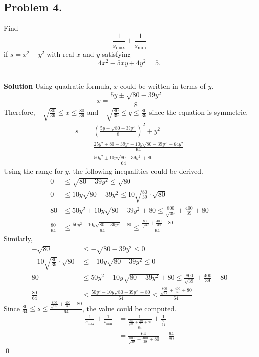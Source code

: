 \documentclass{article}
\newenvironment{solution}{\begin{trivlist}\item[]{\bf Solution}}{\qed \end{trivlist}}
\newcommand{\MyLine}{\noindent\rule{0.99\textwidth}{0.4pt}}
\begin{document}
\subsection*{Problem 4.}
{\color {Gray}
Find
\[
\frac{1}{s_{\max}} + \frac{1}{s_{\min}}
\]
if $s = x^2 + y^2$
with real $x$ and $y$ satisfying
\[
4x^2 - 5xy + 4y^2 = 5.
\]
}
\MyLine
\begin{solution}
Using quadratic formula, $x$ could be written in terms of $y$.
\[
x = \frac{5y \pm \sqrt{80 - 39y^2}}{8}
\]
Therefore, $-\sqrt{\frac{80}{39}} \leq x \leq \frac{80}{39}$
and $-\sqrt{\frac{80}{39}} \leq y \leq \frac{80}{39}$ since
the equation is symmetric.
\begin{align*}
    s
    &= \left( \frac{5y \pm \sqrt{80 - 39y^2}}{8} \right)^2 + y^2 \\
    &= \frac{25y^2 + 80 - 39y^2 \pm 10y\sqrt{80 - 39y^2} + 64y^2}{64} \\
    &= \frac{50y^2 \pm 10y\sqrt{80 - 39y^2} + 80}{64}
\end{align*}
Using the range for $y$, the following inequalities could be derived.
\begin{align*}
    0 &\leq \sqrt{80 - 39y^2} \leq \sqrt{80} \\
    0 &\leq 10y\sqrt{80 - 39y^2}
        \leq 10 \sqrt{\frac{80}{39}} \cdot \sqrt{80} \\
    80 &\leq 50y^2 + 10y\sqrt{80 - 39y^2} + 80
        \leq \frac{800}{\sqrt{39}} + \frac{400}{39} + 80 \\
    \frac{80}{64} &\leq \frac{50y^2 + 10y\sqrt{80 - 39y^2} + 80}{64}
        \leq \frac{\frac{800}{\sqrt{39}} + \frac{400}{39} + 80}{64}
\end{align*}
Similarly,
\begin{align*}
    -\sqrt{80} &\leq -\sqrt{80 - 39y^2} \leq 0 \\
    -10 \sqrt{\frac{80}{39}} \cdot
        \sqrt{80} &\leq -10y\sqrt{80 - 39y^2} \leq 0 \\
    80 &\leq 50y^2 - 10y\sqrt{80 - 39y^2} + 80
        \leq \frac{800}{\sqrt{39}} + \frac{400}{39} + 80 \\
    \frac{80}{64} &\leq \frac{50y^2 - 10y\sqrt{80 - 39y^2} + 80}{64}
        \leq \frac{\frac{800}{\sqrt{39}} + \frac{400}{39} + 80}{64}
\end{align*}
Since $\frac{80}{64} \leq s \leq \frac{\frac{800}{\sqrt{39}}
+ \frac{400}{39} + 80}{64}$, the value could be computed.
\begin{align*}
    \frac{1}{s_{\max}} + \frac{1}{s_{\min}}
    &= \frac{1}{\frac{\frac{800}{\sqrt{39}} + \frac{400}{39} + 80}{64}} + \frac{1}{\frac{80}{64}} \\
    &= \boxed{\frac{64}{\frac{800}{\sqrt{39}} + \frac{400}{39} + 80} + \frac{64}{80}}
\end{align*}
\end{solution}
\end{document}
